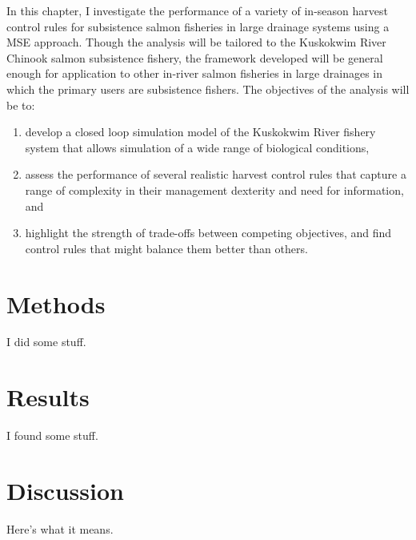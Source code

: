 \documentclass[12pt,]{book}
\theoremstyle{definition}
\theoremstyle{definition}
\theoremstyle{definition}
\theoremstyle{remark}
\begin{document}
In this chapter, I investigate the performance of a variety of in-season
harvest control rules for subsistence salmon fisheries in large drainage
systems using a MSE approach. Though the analysis will be tailored to
the Kuskokwim River Chinook salmon subsistence fishery, the framework
developed will be general enough for application to other in-river
salmon fisheries in large drainages in which the primary users are
subsistence fishers. The objectives of the analysis will be to:

\begin{enumerate}
\def\labelenumi{(\arabic{enumi})}
\item
  develop a closed loop simulation model of the Kuskokwim River fishery
  system that allows simulation of a wide range of biological
  conditions,
\item
  assess the performance of several realistic harvest control rules that
  capture a range of complexity in their management dexterity and need
  for information, and
\item
  highlight the strength of trade-offs between competing objectives, and
  find control rules that might balance them better than others.
\end{enumerate}

\section{Methods}\label{methods}

I did some stuff.

\section{Results}\label{results}

I found some stuff.

\section{Discussion}\label{discussion}

Here's what it means.
\end{document}
